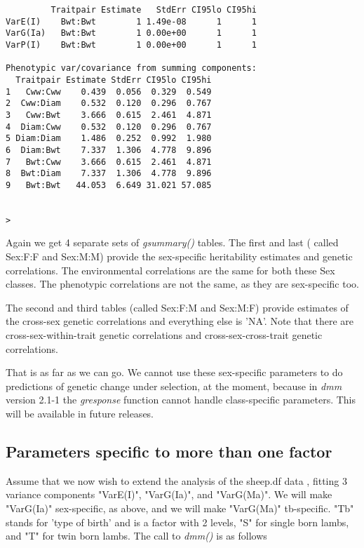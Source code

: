 \documentclass[titlepage]{article}  %
\begin{document}
\begin{verbatim}
         Traitpair Estimate   StdErr CI95lo CI95hi
VarE(I)    Bwt:Bwt        1 1.49e-08      1      1
VarG(Ia)   Bwt:Bwt        1 0.00e+00      1      1
VarP(I)    Bwt:Bwt        1 0.00e+00      1      1

Phenotypic var/covariance from summing components:
  Traitpair Estimate StdErr CI95lo CI95hi
1   Cww:Cww    0.439  0.056  0.329  0.549
2  Cww:Diam    0.532  0.120  0.296  0.767
3   Cww:Bwt    3.666  0.615  2.461  4.871
4  Diam:Cww    0.532  0.120  0.296  0.767
5 Diam:Diam    1.486  0.252  0.992  1.980
6  Diam:Bwt    7.337  1.306  4.778  9.896
7   Bwt:Cww    3.666  0.615  2.461  4.871
8  Bwt:Diam    7.337  1.306  4.778  9.896
9   Bwt:Bwt   44.053  6.649 31.021 57.085


> 
\end{verbatim}
Again we get 4 separate sets of {\em gsummary()} tables.
The first and last ( called Sex:F:F and Sex:M:M) provide the sex-specific heritability estimates and genetic correlations. The environmental correlations are the same for both these Sex classes. The phenotypic correlations are not the same, as they are sex-specific too.

The second and third tables (called Sex:F:M and Sex:M:F) provide estimates of the cross-sex genetic correlations and everything else is 'NA'. Note that there are cross-sex-within-trait genetic correlations and cross-sex-cross-trait genetic correlations.

That is as far as we can go. We cannot use these sex-specific parameters to do predictions of genetic change under selection, at the moment, because in {\em dmm} version 2.1-1 the {\em gresponse} function cannot handle class-specific parameters. This will be available in future releases.

\subsection{Parameters specific to more than one factor}

Assume that we now wish to extend the analysis of the sheep.df data , fitting 3 variance components "VarE(I)", "VarG(Ia)", and "VarG(Ma)". We will make "VarG(Ia)" sex-specific, as above, and we will make "VarG(Ma)" tb-specific. "Tb" stands for 'type of birth' and is a factor with 2 levels, "S" for single born lambs, and "T" for twin born lambs. The call to {\em dmm()} is as follows
\end{document}
